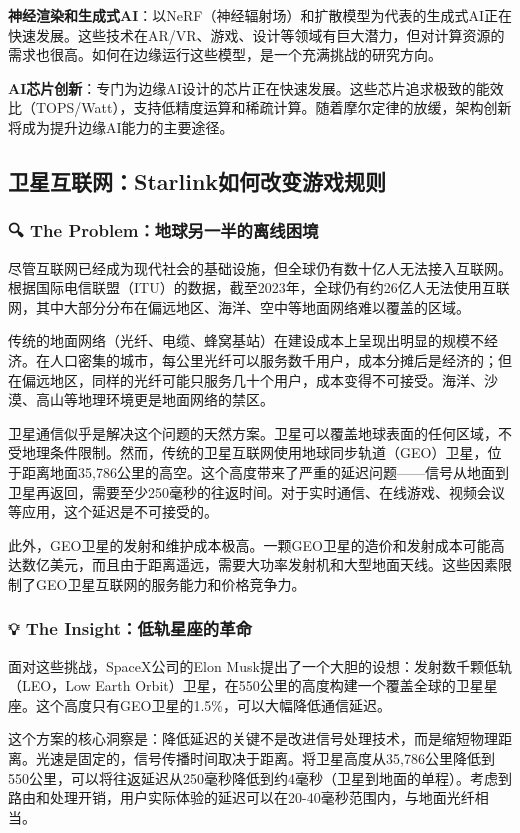\textbf{神经渲染和生成式AI}：以NeRF（神经辐射场）和扩散模型为代表的生成式AI正在快速发展。这些技术在AR/VR、游戏、设计等领域有巨大潜力，但对计算资源的需求也很高。如何在边缘运行这些模型，是一个充满挑战的研究方向。

\textbf{AI芯片创新}：专门为边缘AI设计的芯片正在快速发展。这些芯片追求极致的能效比（TOPS/Watt），支持低精度运算和稀疏计算。随着摩尔定律的放缓，架构创新将成为提升边缘AI能力的主要途径。

\subsection{卫星互联网：Starlink如何改变游戏规则}

\subsubsection{🔍 The Problem：地球另一半的离线困境}

尽管互联网已经成为现代社会的基础设施，但全球仍有数十亿人无法接入互联网。根据国际电信联盟（ITU）的数据，截至2023年，全球仍有约26亿人无法使用互联网，其中大部分分布在偏远地区、海洋、空中等地面网络难以覆盖的区域。

传统的地面网络（光纤、电缆、蜂窝基站）在建设成本上呈现出明显的规模不经济。在人口密集的城市，每公里光纤可以服务数千用户，成本分摊后是经济的；但在偏远地区，同样的光纤可能只服务几十个用户，成本变得不可接受。海洋、沙漠、高山等地理环境更是地面网络的禁区。

卫星通信似乎是解决这个问题的天然方案。卫星可以覆盖地球表面的任何区域，不受地理条件限制。然而，传统的卫星互联网使用地球同步轨道（GEO）卫星，位于距离地面35,786公里的高空。这个高度带来了严重的延迟问题——信号从地面到卫星再返回，需要至少250毫秒的往返时间。对于实时通信、在线游戏、视频会议等应用，这个延迟是不可接受的。

此外，GEO卫星的发射和维护成本极高。一颗GEO卫星的造价和发射成本可能高达数亿美元，而且由于距离遥远，需要大功率发射机和大型地面天线。这些因素限制了GEO卫星互联网的服务能力和价格竞争力。

\subsubsection{💡 The Insight：低轨星座的革命}

面对这些挑战，SpaceX公司的Elon Musk提出了一个大胆的设想：发射数千颗低轨（LEO，Low Earth Orbit）卫星，在550公里的高度构建一个覆盖全球的卫星星座。这个高度只有GEO卫星的1.5\%，可以大幅降低通信延迟。

这个方案的核心洞察是：降低延迟的关键不是改进信号处理技术，而是缩短物理距离。光速是固定的，信号传播时间取决于距离。将卫星高度从35,786公里降低到550公里，可以将往返延迟从250毫秒降低到约4毫秒（卫星到地面的单程）。考虑到路由和处理开销，用户实际体验的延迟可以在20-40毫秒范围内，与地面光纤相当。

